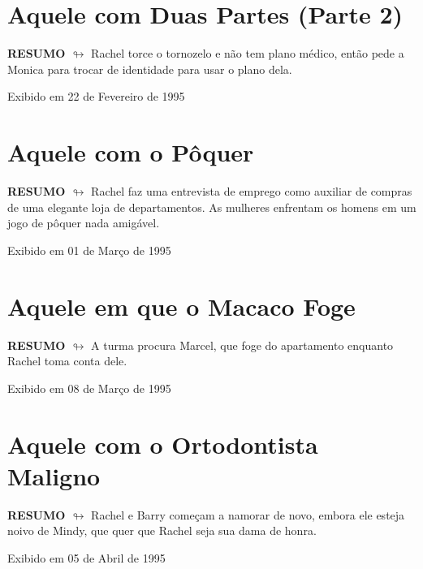\chapter{Aquele com Duas Partes (Parte 2)}

\textbf{RESUMO $\looparrowright$} Rachel torce o tornozelo e não tem plano médico, então pede a Monica para trocar de identidade para usar o plano dela.

\begin{flushright}
\textcolor{gray600}{Exibido em 22 de Fevereiro de 1995}
\end{flushright}


\chapter{Aquele com o Pôquer}

\textbf{RESUMO $\looparrowright$} Rachel faz uma entrevista de emprego como auxiliar de compras de uma elegante loja de departamentos. As mulheres enfrentam os homens em um jogo de pôquer nada amigável.

\begin{flushright}
\textcolor{gray600}{Exibido em 01 de Março de 1995}
\end{flushright}


\chapter{Aquele em que o Macaco Foge}

\textbf{RESUMO $\looparrowright$} A turma procura Marcel, que foge do apartamento enquanto Rachel toma conta dele.

\begin{flushright}
\textcolor{gray600}{Exibido em 08 de Março de 1995}
\end{flushright}


\chapter{Aquele com o Ortodontista Maligno}

\textbf{RESUMO $\looparrowright$} Rachel e Barry começam a namorar de novo, embora ele esteja noivo de Mindy, que quer que Rachel seja sua dama de honra.

\begin{flushright}
\textcolor{gray600}{Exibido em 05 de Abril de 1995}
\end{flushright}


